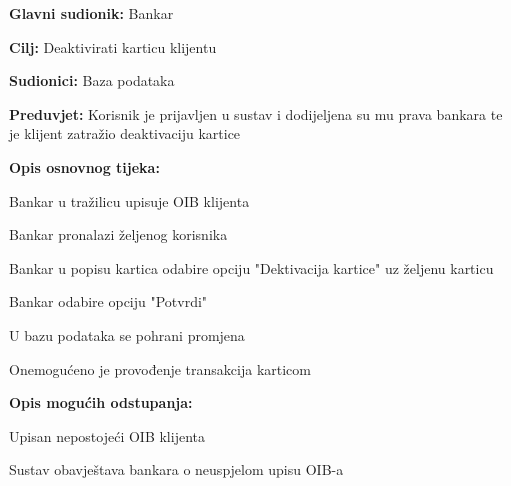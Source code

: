                 
                \noindent {}
                \begin{packed_item}
                	
                	\item \textbf{Glavni sudionik: }Bankar
                	\item  \textbf{Cilj:} Deaktivirati karticu klijentu
                	\item  \textbf{Sudionici:} Baza podataka
                	\item  \textbf{Preduvjet:} Korisnik je prijavljen u sustav i dodijeljena su mu prava bankara te je klijent zatražio deaktivaciju kartice
                	\item  \textbf{Opis osnovnog tijeka:}
                	
                	\item[] \begin{packed_enum}
                		
                		\item Bankar u tražilicu upisuje OIB klijenta
                		\item Bankar pronalazi željenog korisnika
                		\item Bankar u popisu kartica odabire opciju "Dektivacija kartice" uz željenu karticu
                		\item Bankar odabire opciju "Potvrdi"
                		\item U bazu podataka se pohrani promjena 
                		\item Onemogućeno je provođenje transakcija karticom
                	\end{packed_enum}
                	
                	\item  \textbf{Opis mogućih odstupanja:} 
                	
                	\item[] \begin{packed_item}
                		
                		\item[1.a] Upisan nepostojeći OIB klijenta
                		\item[] \begin{packed_enum}
                			
                			\item Sustav obavještava bankara o neuspjelom upisu OIB-a
                			
                		\end{packed_enum}
                		
                	\end{packed_item}
                \end{packed_item}
                
